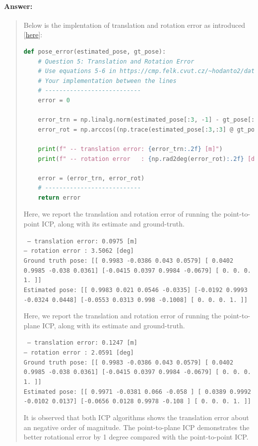 \documentclass[11pt]{article}
\begin{document}
\paragraph{Answer:} 
\begin{quote}

Below is the implentation of translation and rotation error as introduced [\href{https://cmp.felk.cvut.cz/~hodanto2/data/hodan2016evaluation.pdf}{here}]:

\begin{lstlisting}[language=Python, basicstyle=\scriptsize]
def pose_error(estimated_pose, gt_pose):
    # Question 5: Translation and Rotation Error 
    # Use equations 5-6 in https://cmp.felk.cvut.cz/~hodanto2/data/hodan2016evaluation.pdf
    # Your implementation between the lines
    # ---------------------------
    error = 0
  
    error_trn = np.linalg.norm(estimated_pose[:3, -1] - gt_pose[:3, -1])
    error_rot = np.arccos((np.trace(estimated_pose[:3,:3] @ gt_pose[:3,:3].T) - 1) / 2)
    
    print(f" -- translation error: {error_trn:.2f} [m]")
    print(f" -- rotation error   : {np.rad2deg(error_rot):.2f} [deg]")
    
    error = (error_trn, error_rot)
    # ---------------------------
    return error
\end{lstlisting}

Here, we report the translation and rotation error of running the point-to-point ICP, along with its estimate and ground-truth.

{\tt
-- translation error: 0.0975 [m]    \\
-- rotation error   : 3.5062 [deg]  \\
Ground truth pose:  
[[ 0.9983 -0.0386  0.043   0.0579]
[ 0.0402  0.9985 -0.038   0.0361] 
[-0.0415  0.0397  0.9984 -0.0679] 
[ 0.      0.      0.      1.    ]] \\
Estimated pose:
[[ 0.9983  0.021   0.0546 -0.0335]
[-0.0192  0.9993 -0.0324  0.0448]
[-0.0553  0.0313  0.998  -0.1008]
[ 0.      0.      0.      1.    ]]
}

Here, we report the translation and rotation error of running the point-to-plane ICP, along with its estimate and ground-truth.

{\tt
-- translation error: 0.1247 [m]    \\
-- rotation error   : 2.0591 [deg]  \\
Ground truth pose:
[[ 0.9983 -0.0386  0.043   0.0579]
[ 0.0402  0.9985 -0.038   0.0361] 
[-0.0415  0.0397  0.9984 -0.0679] 
[ 0.      0.      0.      1.    ]]  \\
Estimated pose:
[[ 0.9971 -0.0381  0.066  -0.058 ]
[ 0.0389  0.9992 -0.0102  0.0137] 
[-0.0656  0.0128  0.9978 -0.108 ] 
[ 0.      0.      0.      1.    ]]
}

It is observed that both ICP algorithms shows the translation error about an negative order of magnitude. The point-to-plane ICP demonstrates the better rotational error by 1 degree compared with the point-to-point ICP.

\end{quote}
\end{document}
